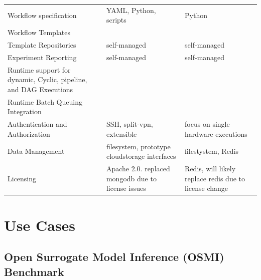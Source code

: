 \documentclass[sigconf]{acmart}
\newcommand{\YES}{\ding{51}}
\begin{document}
\begin{table}[htbp]
{\begin{tabular}{|p{6cm}|l|l|}
Workflow specification &  YAML, Python, scripts   & Python   \\
Workflow Templates &  \YES   &  \YES  \\ 
\hline
Template Repositories & self-managed    &  self-managed  \\ 
\hline
Experiment Reporting &  self-managed   & self-managed   \\ 
\hline
Runtime support for dynamic, Cyclic, pipeline, and DAG \hline
Executions &     \YES & \YES \\
\hline
Runtime Batch Queuing Integration &  \YES   & \YES   \\
\hline
Authentication and Authorization &  SSH, split-vpn, extensible   & focus on single hardware executions  \\
\hline
Data Management & filesystem, prototype cloudstorage interfaces   & filestystem, Redis   \\
\hline
Licensing & Apache 2.0. replaced mongodb due to license 
issues    & Redis, will likely replace redis due to license change \\
\hline
\end{tabular}
}
\end{table}


\section{Use Cases}
\label{sec:use_cases}


\subsection{Open Surrogate Model Inference (OSMI) Benchmark}
\end{document}
